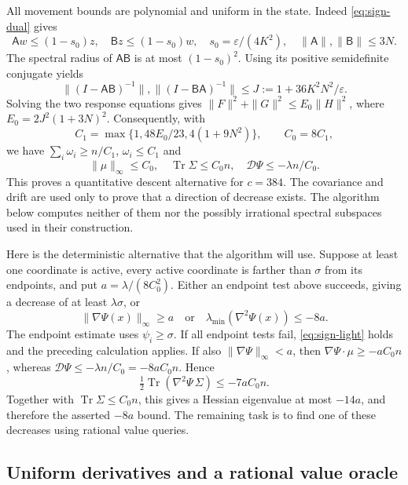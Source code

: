 All movement bounds are polynomial and uniform in the state.
Indeed \eqref{eq:sign-dual} gives
\[
 \mathsf Aw\le(1-s_0)z,\quad
 \mathsf Bz\le(1-s_0)w,\quad
 s_0=\varepsilon/(4K^2),\quad
 \|\mathsf A\|,\|\mathsf B\|\le3N.
\]
The spectral radius of $\mathsf A\mathsf B$ is at most $(1-s_0)^2$.
Using its positive semidefinite conjugate yields
\[
 \|(I-\mathsf A\mathsf B)^{-1}\|,
 \|(I-\mathsf B\mathsf A)^{-1}\|
 \le J:=1+36K^2N^2/\varepsilon.
\]
Solving the two response equations gives
$\|F\|^2+\|G\|^2\le E_0\|H\|^2$, where
$E_0=2J^2(1+3N)^2$.  Consequently, with
\[
 C_1=\max\{1,48E_0/23,4(1+9N^2)\},\qquad C_0=8C_1,
\]
we have $\sum_i\omega_i\ge n/C_1$, $\omega_i\le C_1$ and
\begin{equation}
 \|\mu\|_\infty\le C_0,\quad
 \operatorname{Tr}\Sigma\le C_0n,\quad
 \mathcal D\Psi\le-\lambda n/C_0.
 \label{eq:sign-progress}
\end{equation}
This proves a quantitative descent alternative for $c=384$.
The covariance and drift are used only to prove that a direction of
decrease exists.  The algorithm below computes neither of them nor
the possibly irrational spectral subspaces used in their construction.

Here is the deterministic alternative that the algorithm will use.
Suppose at least one coordinate is active, every active coordinate is
farther than $\sigma$ from its endpoints, and put
$a=\lambda/(8C_0^2)$. Either an endpoint test above
succeeds, giving a decrease of at least $\lambda\sigma$, or
\begin{equation}
 \|\nabla\Psi(x)\|_\infty\ge a
 \quad\text{or}\quad
 \lambda_{\min}(\nabla^2\Psi(x))\le-8a.
 \label{eq:sign-deterministic-alternative}
\end{equation}
The endpoint estimate uses $\psi_i\ge\sigma$. If all endpoint tests
fail, \eqref{eq:sign-light} holds and the preceding calculation
applies. If also $\|\nabla\Psi\|_\infty<a$, then
$\nabla\Psi\cdot\mu\ge-aC_0n$, whereas
$\mathcal D\Psi\le-\lambda n/C_0=-8aC_0n$. Hence
\[
 \tfrac12\operatorname{Tr}(\nabla^2\Psi\,\Sigma)
       \le-7aC_0n.
\]
Together with $\operatorname{Tr}\Sigma\le C_0n$, this gives a
Hessian eigenvalue at most $-14a$, and therefore the asserted
$-8a$ bound. The remaining task is to find one of these decreases
using rational value queries.

\subsection{Uniform derivatives and a rational value oracle}

